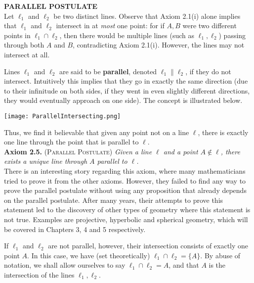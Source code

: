 \documentclass[leqno]{book}
\begin{document}
\noindent\textbf{PARALLEL POSTULATE}\\

\noindent Let $\ell_1$ and $\ell_2$ be two distinct lines.  Observe that Axiom 2.1(i) alone implies that $\ell_1$ and $\ell_2$ intersect in at \emph{most} one point: for if $A,B$ were two different points in $\ell_1\cap\ell_2$, then there would be multiple lines (such as $\ell_1,\ell_2$) passing through both $A$ and $B$, contradicting Axiom 2.1(i).  However, the lines may not intersect at all.

Lines $\ell_1$ and $\ell_2$ are said to be \textbf{parallel}, denoted $\ell_1\parallel\ell_2$, if they do not intersect.  Intuitively this implies that they go in exactly the same direction (due to their infinitude on both sides, if they went in even slightly different directions, they would eventually approach on one side).  The concept is illustrated below.
\begin{center}\texttt{[image: ParallelIntersecting.png]}\end{center}
Thus, we find it believable that given any point not on a line $\ell$, there is exactly one line through the point that is parallel to $\ell$.\\

\noindent\textbf{Axiom 2.5.} \textsc{(Parallel Postulate)} \emph{Given a line $\ell$ and a point $A\notin\ell$, there exists a unique line through $A$ parallel to $\ell$.}\\

\noindent There is an interesting story regarding this axiom, where many mathematicians tried to prove it from the other axioms.  However, they failed to find any way to prove the parallel postulate without using any proposition that already depends on the parallel postulate.  After many years, their attempts to prove this statement led to the discovery of other types of geometry where this statement is not true.  Examples are projective, hyperbolic and spherical geometry, which will be covered in Chapters 3, 4 and 5 respectively. %

If $\ell_1$ and $\ell_2$ are not parallel, however, their intersection consists of exactly one point $A$.  In this case, we have (set theoretically) $\ell_1\cap\ell_2=\{A\}$.  By abuse of notation, we shall allow ourselves to say $\ell_1\cap\ell_2=A$, and that $A$ is the intersection of the lines $\ell_1,\ell_2$.\\
\end{document}
